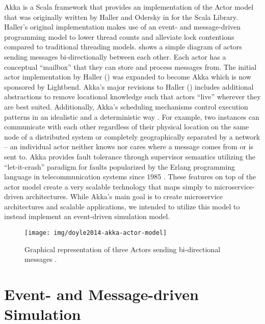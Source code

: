 Akka is a Scala framework that provides an implementation of the Actor model \cite{Agha1985} that was originally written by Haller and Odersky in \cite{Haller2009} for the Scala Library. Haller's \cite{Haller2009} original implementation makes use of an event- and message-driven programming model to lower thread counts and alleviate lock contentions compared to traditional threading models.  shows a simple diagram of actors sending messages bi-directionally between each other. Each actor has a conceptual ``mailbox'' that they can store and process messages from. The initial actor implementation by Haller (\cite{Haller2009}) was expanded to become Akka which is now sponsored by Lightbend. Akka's major revisions to Haller (\cite{Haller2009}) includes additional abstractions to remove locational knowledge such that actors ``live'' wherever they are best suited. Additionally, Akka's scheduling mechanisms control \akkaActor{} execution patterns in an idealistic and a deterministic way \cite{TypesafeAkka2015}. For example, two \akkaActor{} instances can communicate with each other regardless of their physical location on the same node of a distributed system or completely geographically separated by a network -- an individual actor neither knows nor cares where a message comes from or is sent to. Akka provides fault tolerance through supervisor semantics utilizing the ``let-it-crash'' paradigm for faults popularized by the Erlang programming language in telecommunication systems since 1985 \cite{Armstrong2010}. These features on top of the actor model create a very scalable technology that maps simply to microservice-driven architectures. While Akka's main goal is to create microservice architectures and scalable applications, we intended to utilize this model to instead implement an event-driven simulation model.

\begin{figure}[th!]
    \centering
    \texttt{[image: img/doyle2014-akka-actor-model]}
    \caption{Graphical representation of three Actors sending bi-directional messages \cite{DoyleAkka2014}.}
    \label{fig:doyle2014-akka-actor-model}
\end{figure} 

\section{Event- and Message-driven Simulation}

